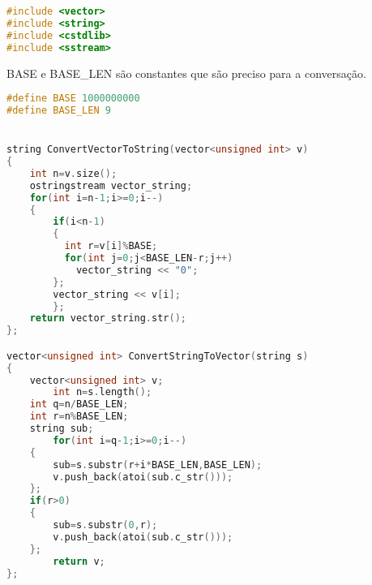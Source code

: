 \begin{lstlisting}[language=C++]
#include <vector>
#include <string>
#include <cstdlib>
#include <sstream>
\end{lstlisting}

BASE e BASE\_LEN são constantes que são preciso para a conversação.
\begin{lstlisting}[language=C++]
#define BASE 1000000000
#define BASE_LEN 9


string ConvertVectorToString(vector<unsigned int> v)
{
	int n=v.size();
	ostringstream vector_string;
	for(int i=n-1;i>=0;i--)
	{
		if(i<n-1)
		{
		  int r=v[i]%BASE;
		  for(int j=0;j<BASE_LEN-r;j++)
			vector_string << "0";
		};
		vector_string << v[i];
        };
	return vector_string.str();
};

vector<unsigned int> ConvertStringToVector(string s)
{
	vector<unsigned int> v;
        int n=s.length();
	int q=n/BASE_LEN;
	int r=n%BASE_LEN;
	string sub;
        for(int i=q-1;i>=0;i--)
	{
		sub=s.substr(r+i*BASE_LEN,BASE_LEN);				
		v.push_back(atoi(sub.c_str()));
	};
	if(r>0)
	{ 
		sub=s.substr(0,r);
		v.push_back(atoi(sub.c_str()));
	};
        return v;
};
\end{lstlisting}








